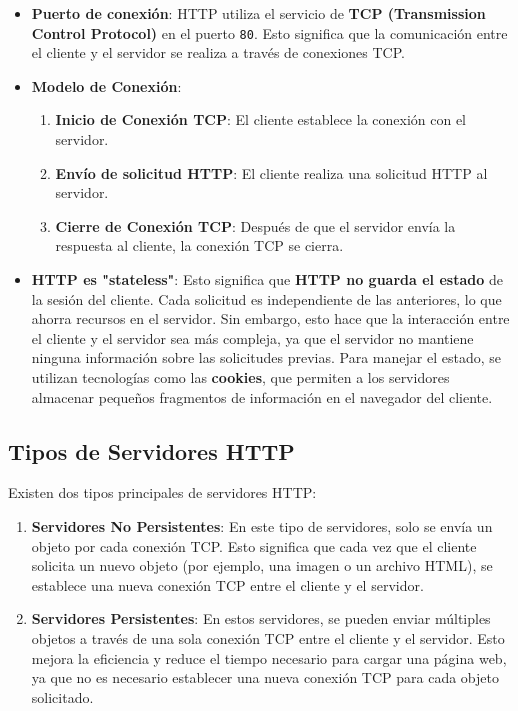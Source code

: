 \documentclass[a4paper,12pt]{article}
\begin{document}
\begin{itemize}
    \item \textbf{Puerto de conexión}: HTTP utiliza el servicio de \textbf{TCP (Transmission Control Protocol)} en el puerto \texttt{80}. Esto significa que la comunicación entre el cliente y el servidor se realiza a través de conexiones TCP.
    \item \textbf{Modelo de Conexión}:
    \begin{enumerate}
        \item \textbf{Inicio de Conexión TCP}: El cliente establece la conexión con el servidor.
        \item \textbf{Envío de solicitud HTTP}: El cliente realiza una solicitud HTTP al servidor.
        \item \textbf{Cierre de Conexión TCP}: Después de que el servidor envía la respuesta al cliente, la conexión TCP se cierra.
    \end{enumerate}
    \item \textbf{HTTP es "stateless"}: Esto significa que \textbf{HTTP no guarda el estado} de la sesión del cliente. Cada solicitud es independiente de las anteriores, lo que ahorra recursos en el servidor. Sin embargo, esto hace que la interacción entre el cliente y el servidor sea más compleja, ya que el servidor no mantiene ninguna información sobre las solicitudes previas. Para manejar el estado, se utilizan tecnologías como las \textbf{cookies}, que permiten a los servidores almacenar pequeños fragmentos de información en el navegador del cliente.
\end{itemize}

\subsection{Tipos de Servidores HTTP}
Existen dos tipos principales de servidores HTTP:

\begin{enumerate}
    \item \textbf{Servidores No Persistentes}: En este tipo de servidores, solo se envía un objeto por cada conexión TCP. Esto significa que cada vez que el cliente solicita un nuevo objeto (por ejemplo, una imagen o un archivo HTML), se establece una nueva conexión TCP entre el cliente y el servidor.
    \item \textbf{Servidores Persistentes}: En estos servidores, se pueden enviar múltiples objetos a través de una sola conexión TCP entre el cliente y el servidor. Esto mejora la eficiencia y reduce el tiempo necesario para cargar una página web, ya que no es necesario establecer una nueva conexión TCP para cada objeto solicitado.
\end{enumerate}
\end{document}
